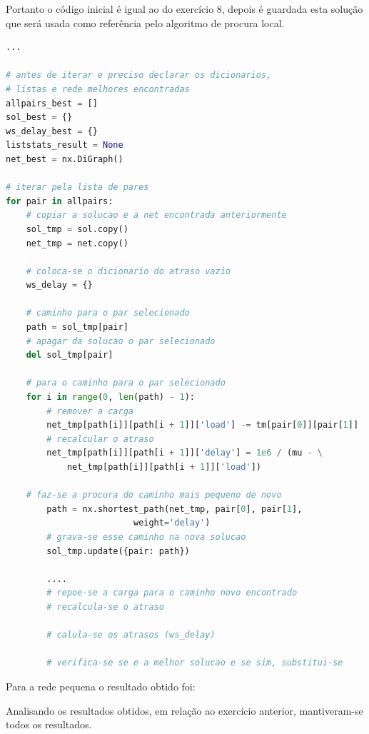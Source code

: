 \documentclass[pdftex,12pt,a4paper]{report}
\begin{document}
Portanto o código inicial é igual ao do exercício 8, depois é guardada esta solução que será usada como referência pelo algoritmo de procura local. 

\begin{lstlisting}[language=python]
...

# antes de iterar e preciso declarar os dicionarios, 
# listas e rede melhores encontradas
allpairs_best = []
sol_best = {}
ws_delay_best = {}
liststats_result = None
net_best = nx.DiGraph()

# iterar pela lista de pares
for pair in allpairs:
	# copiar a solucao e a net encontrada anteriormente
	sol_tmp = sol.copy()
    net_tmp = net.copy()
    
    # coloca-se o dicionario do atraso vazio
    ws_delay = {}
	
	# caminho para o par selecionado
    path = sol_tmp[pair]
    # apagar da solucao o par selecionado
    del sol_tmp[pair]
    
    # para o caminho para o par selecionado
    for i in range(0, len(path) - 1):
    	# remover a carga
        net_tmp[path[i]][path[i + 1]]['load'] -= tm[pair[0]][pair[1]]
        # recalcular o atraso
        net_tmp[path[i]][path[i + 1]]['delay'] = 1e6 / (mu - \
        	net_tmp[path[i]][path[i + 1]]['load'])
		
	# faz-se a procura do caminho mais pequeno de novo
    	path = nx.shortest_path(net_tmp, pair[0], pair[1],
    					 weight='delay')
    	# grava-se esse caminho na nova solucao
    	sol_tmp.update({pair: path})		
    	
    	....
    	# repoe-se a carga para o caminho novo encontrado
    	# recalcula-se o atraso
    	
    	# calula-se os atrasos (ws_delay)
    	
    	# verifica-se se e a melhor solucao e se sim, substitui-se
\end{lstlisting}

Para a rede pequena o resultado obtido foi:







Analisando os resultados obtidos, em relação ao exercício anterior, mantiveram-se todos os resultados.

\end{document}
